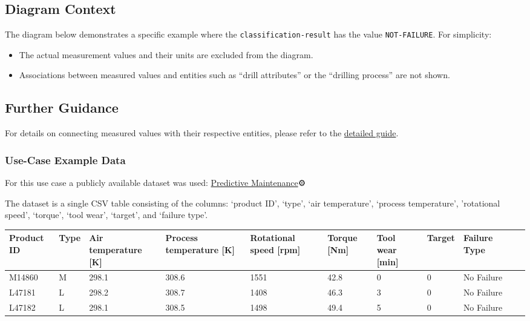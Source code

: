 \subsection*{Diagram Context}  
The diagram below demonstrates a specific example where the \texttt{classification-result} has the value \texttt{NOT-FAILURE}. For simplicity:
\begin{itemize}
    \item The actual measurement values and their units are excluded from the diagram.
    \item Associations between measured values and entities such as “drill attributes” or the “drilling process” are not shown.
\end{itemize}

\subsection*{Further Guidance}  
For details on connecting measured values with their respective entities, please refer to the \href{placeholder link}{detailed guide}.  

\subsubsection*{Use-Case Example Data}

For this use case a publicly available dataset was used: \href{https://www.kaggle.com/code/zakikurdya/predictive-maintenance}{Predictive Maintenance}⚙️ 

The dataset is a single CSV table consisting of the columns: ‘product ID’, ‘type’, ‘air temperature’, ‘process temperature’, ’rotational speed’, ‘torque’, ‘tool wear’, ‘target’, and ‘failure type’.

\begin{tabularx}{\textwidth}{|l|X|X|X|X|X|X|X|X|X|X|}
\hline
Product ID & Type & Air temperature {[}K{]} & Process temperature {[}K{]} & Rotational speed {[}rpm{]} & Torque {[}Nm{]} & Tool wear {[}min{]} & Target & Failure Type \\ \hline
M14860     & M    & 298.1                   & 308.6                       & 1551                       & 42.8            & 0                   & 0      & No Failure   \\
L47181     & L    & 298.2                   & 308.7                       & 1408                       & 46.3            & 3                   & 0      & No Failure   \\
L47182     & L    & 298.1                   & 308.5                       & 1498                       & 49.4            & 5                   & 0      & No Failure   \\ \hline
\end{tabularx}

